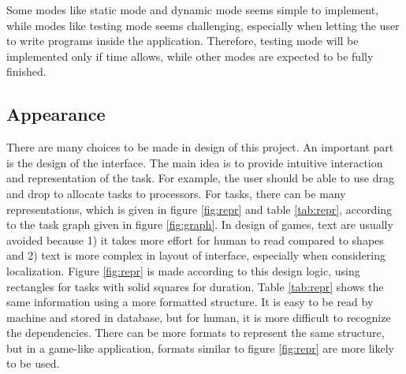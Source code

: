 \documentclass[a4paper,11pt]{article}
\begin{document}
Some modes like static mode and dynamic mode seems simple to implement, while modes like testing mode seems challenging, especially when letting the user to write programs inside the application. Therefore, testing mode will be implemented only if time allows, while other modes are expected to be fully finished.

\subsection{Appearance} \label{sec:aprc}

There are many choices to be made in design of this project. An important part is the design of the interface. The main idea is to provide intuitive interaction and representation of the task. For example, the user should be able to use drag and drop to allocate tasks to processors. For tasks, there can be many representations, which is given in figure \ref{fig:repr} and table \ref{tab:repr}, according to the task graph given in figure \ref{fig:graph}. In design of games, text are usually avoided because 1) it takes more effort for human to read compared to shapes and 2) text is more complex in layout of interface, especially when considering localization. Figure \ref{fig:repr} is made according to this design logic, using rectangles for tasks with solid squares for duration. Table \ref{tab:repr} shows the same information using a more formatted structure. It is easy to be read by machine and stored in database, but for human, it is more difficult to recognize the dependencies. There can be more formats to represent the same structure, but in a game-like application, formats similar to figure \ref{fig:repr} are more likely to be used.
\end{document}
